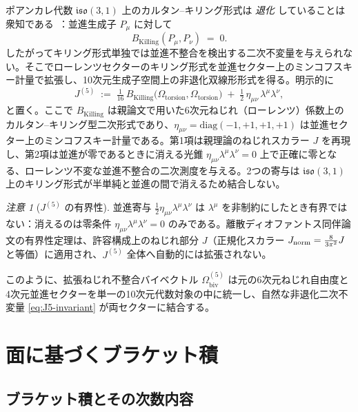 \documentclass[dvipdfmx,11pt,a4paper]{article}
\theoremstyle{definition}
\theoremstyle{plain}
\theoremstyle{remark}
\newtheorem{remark}{注意}
\begin{document}
ポアンカレ代数 $\mathfrak{iso}(3,1)$ 上のカルタン--キリング形式は \emph{退化} していることは衆知である~\cite{FultonHarris1991,Humphreys1972}：並進生成子 $P_{\mu}$ に対して
\[
B_{\text{Killing}}(P_{\mu},P_{\nu})\;=\;0.
\]
したがってキリング形式単独では並進不整合を検出する二次不変量を与えられない。そこでローレンツセクターのキリング形式を並進セクター上のミンコフスキー計量で拡張し、10次元生成子空間上の非退化双線形形式を得る。明示的に
\begin{equation}
\boxed{\;
J^{(5)}
\;:=\;
\tfrac{1}{16}\,B_{\text{Killing}}\!\bigl(\Omega_{\text{torsion}},\Omega_{\text{torsion}}\bigr)
\;+\;
\tfrac{1}{2}\,\eta_{\mu\nu}\,\lambda^{\mu}\lambda^{\nu},
\;}
\label{eq:J5-invariant}
\end{equation}
と置く。ここで $B_{\text{Killing}}$ は親論文で用いた6次元ねじれ（ローレンツ）係数上のカルタン--キリング型二次形式であり、$\eta_{\mu\nu}=\mathrm{diag}(-1,+1,+1,+1)$ は並進セクター上のミンコフスキー計量である。第1項は親理論のねじれスカラー $J$ を再現し、第2項は並進が零であるときに消える光錐 $\eta_{\mu\nu}\lambda^{\mu}\lambda^{\nu}=0$ 上で正確に零となる、ローレンツ不変な並進不整合の二次測度を与える。2つの寄与は $\mathfrak{iso}(3,1)$ 上のキリング形式が半単純と並進の間で消えるため結合しない。

\begin{remark}[\(J^{(5)}\) の有界性]
\label{rem:J5-bounded}
並進寄与 $\tfrac{1}{2}\eta_{\mu\nu}\lambda^{\mu}\lambda^{\nu}$ は $\lambda^{\mu}$ を非制約にしたとき有界ではない：消えるのは零条件 $\eta_{\mu\nu}\lambda^{\mu}\lambda^{\nu}=0$ のみである。離散ディオファントス同伴論文の有界性定理は、許容構成上のねじれ部分 $J$（正規化スカラー $J_{\rm norm}=\frac{8}{3\pi^2}J$ と等価）に適用され、$J^{(5)}$ 全体へ自動的には拡張されない。
\end{remark}

このように、拡張ねじれ不整合バイベクトル $\Omega_{\text{biv}}^{(5)}$ は元の6次元ねじれ自由度と4次元並進セクターを単一の10次元代数対象の中に統一し、自然な非退化二次不変量 \eqref{eq:J5-invariant} が両セクターに結合する。

\section{面に基づくブラケット積}
\label{sec:brackets-open}

\subsection{ブラケット積とその次数内容}
\end{document}
